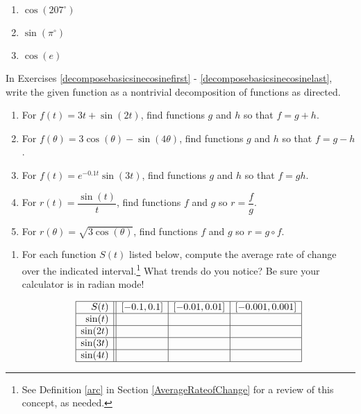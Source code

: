 \begin{multicols}{3}

\begin{enumerate}

\setcounter{enumi}{\value{HW}}

\item $\cos(207^{\circ})$
\item $\sin\left( \pi^{\circ} \right)$
\item $\cos(e)$ \label{calculatorlast} 

\setcounter{HW}{\value{enumi}}

\end{enumerate}

\end{multicols}

In Exercises \ref{decomposebasicsinecosinefirst} - \ref{decomposebasicsinecosinelast}, write the given function as a nontrivial decomposition of functions as directed.

\begin{enumerate}
\setcounter{enumi}{\value{HW}}

\item  For $f(t) = 3t + \sin(2t)$, find functions $g$ and $h$ so that $f=g+h$. \label{decomposebasicsinecosinefirst}
\item  For $f(\theta) = 3\cos(\theta) - \sin(4\theta)$, find functions $g$ and $h$ so that $f=g-h$. 
\item  For $f(t) = e^{-0.1t} \sin(3t)$, find functions $g$ and $h$ so that $f=gh$.
\item  For $r(t) = \dfrac{\sin(t)}{t}$, find functions $f$ and $g$ so $r = \dfrac{f}{g}$.
\item  For $r(\theta) =\sqrt{3 \cos(\theta)}$, find functions $f$ and $g$ so $r = g \circ f$. \label{decomposebasicsinecosinelast}

\setcounter{HW}{\value{enumi}}
\end{enumerate}

\begin{enumerate}
\setcounter{enumi}{\value{HW}}

\item \label{sinearcexercise}For each function $S(t)$ listed below, compute the average rate of change over the indicated interval.\footnote{See Definition \ref{arc} in Section \ref{AverageRateofChange} for a review of this concept, as needed.}  What trends do you notice? Be sure your calculator is in radian mode!

\[ \begin{array}{|r||c|c|c|}  \hline

 S(t) &  [-0.1, 0.1] & [-0.01, 0.01] &[-0.001, 0.001] \\ \hline
 \sin(t)     &&&  \\  \hline
 \sin(2t)   &&&  \\ \hline
 \sin(3t)   &&&   \\  \hline
\sin(4t)   &&&   \\  \hline

\end{array} \]

\setcounter{HW}{\value{enumi}}
\end{enumerate}

